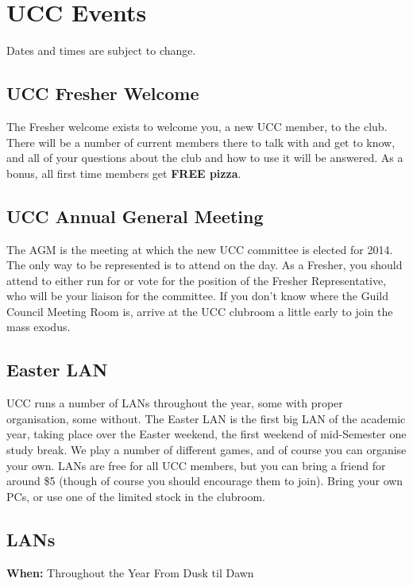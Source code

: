\chapter{UCC Events}
Dates and times are subject to change.


\section{UCC Fresher Welcome}

The Fresher welcome exists to welcome you, a new UCC member, to the club. There will be a number of current members there to talk with and get to know, and all of your questions about the club and how to use it will be answered. As a bonus, all first time members get {\bf FREE pizza}.

\section{UCC Annual General Meeting}

The AGM is the meeting at which the new UCC committee is elected for 2014. The only way to be represented is to attend on the day. As a Fresher, you should attend to either run for or vote for the position of the Fresher Representative, who will be your liaison for the committee. If you don't know where the Guild Council Meeting Room is, arrive at the UCC clubroom a little early to join the mass exodus.

\section{Easter LAN}

UCC runs a number of LANs throughout the year, some with proper organisation, some without. The Easter LAN is the first big LAN of the academic year, taking place over the Easter weekend, the first weekend of mid-Semester one study break. We play a number of different games, and of course you can organise your own. LANs are free for all UCC members, but you can bring a friend for around \$5 (though of course you should encourage them to join). Bring your own PCs, or use one of the limited stock in the clubroom.

\section{LANs}
{\bf When:} Throughout the Year
From Dusk til Dawn

